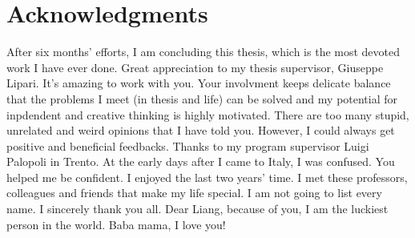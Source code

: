 \chapter{Acknowledgments}
After six months' efforts, I am concluding this thesis,
which is the most devoted work I have ever done. Great 
appreciation to my thesis supervisor, Giuseppe Lipari.
It's amazing to work with you. Your involvment keeps
delicate balance that the problems I meet (in thesis 
and life) can be solved and my potential for inpdendent 
and creative thinking is highly motivated. There are too 
many stupid, unrelated and weird opinions that I have 
told you. However, I could always get positive and 
beneficial feedbacks. 
Thanks to my program supervisor Luigi Palopoli in Trento.
At the early days after I came to Italy, I was confused. 
You helped me be confident. 
I enjoyed the last two years' time. I met these professors, 
colleagues and friends that make my life special. I am not 
going to list every name. I sincerely thank you all. 
Dear Liang, because of you, I am the luckiest person in 
the world. 
Baba mama, I love you!
